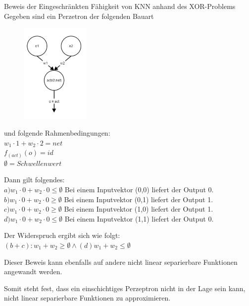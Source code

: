 \begin{bew}Beweis der Eingeschränkten Fähigkeit von KNN anhand des XOR-Problems\\

Gegeben sind ein Perzetron der folgenden Bauart

\begin{figure}[H]
\centering
		\includegraphics[width=0.30\textwidth]{Perzeptron.PNG}
\end{figure}

und folgende Rahmenbedingungen:\\
$w_1\cdot1 + w_2\cdot2 = net$\\ 
$f_(act)(o) = id$ \\
$\emptyset = Schwellenwert$

Dann gilt folgendes:\\
$a) w_1\cdot0 + w_2\cdot0 \le \emptyset$ Bei einem Inputvektor (0,0) liefert der Output 0.\\
$b) w_1\cdot0 + w_2\cdot0 \geq \emptyset$ Bei einem Inputvektor (0,1) liefert der Output 1.\\
$c) w_1\cdot0 + w_2\cdot0 \geq \emptyset$ Bei einem Inputvektor (1,0) liefert der Output 1.\\
$d) w_1\cdot0 + w_2\cdot0 \le \emptyset$ Bei einem Inputvektor (1,1) liefert der Output 0.

Der Widerspruch ergibt sich wie folgt:\\ $(b+c):  w_1 + w_2 \geq \emptyset  \wedge (d)  w_1 + w_2 \leq \emptyset$
\label{bew:Beweis der eingeschränkten linearer Separierbarkeit}
\end{bew}

Dieser Beweis kann ebenfalls auf andere nicht linear separierbare Funktionen angewandt werden.

Somit steht fest, dass ein einschichtiges Perzeptron nicht in der Lage sein kann, nicht linear separierbare Funktionen zu approximieren.


